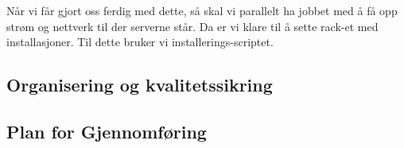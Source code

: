 \documentclass[12pt,a4paper]{article}
\begin{document}
Når vi får gjort oss ferdig med dette, så skal vi parallelt ha jobbet med å få opp strøm og nettverk til der serverne står. Da er vi klare
til å sette rack-et med installasjoner. Til dette bruker vi installerings-scriptet. 

\subsection{Organisering og kvalitetssikring}

\subsection{Plan for Gjennomføring}
\end{document}
